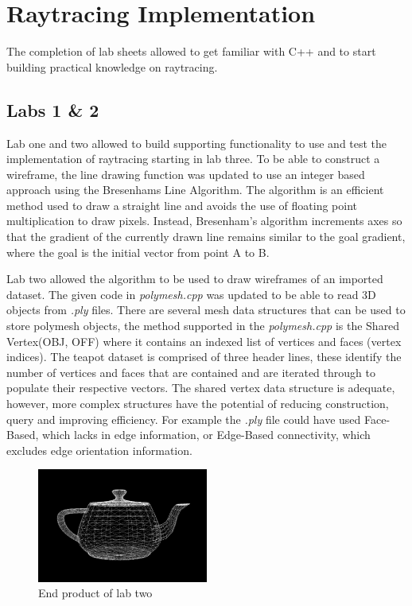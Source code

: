 \documentclass{article}
\begin{document}
\section{Raytracing Implementation}
The completion of lab sheets allowed to get familiar with C++ and to start building practical knowledge on raytracing. 

\subsection{Labs 1 \& 2}
Lab one and two allowed to build supporting functionality to use and test the implementation of raytracing starting in lab three. To be able to construct a wireframe, the line drawing function was updated to use an integer based approach using the Bresenhams Line Algorithm. The algorithm is an efficient method used to draw a straight line and avoids the use of floating point multiplication to draw pixels. Instead, Bresenham's algorithm increments axes so that the gradient of the currently drawn line remains similar to the goal gradient, where the goal is the initial vector from point A to B.

Lab two allowed the algorithm to be used to draw wireframes of an imported dataset. The given code in \textit{polymesh.cpp} was updated to be able to read 3D objects from \textit{.ply} files. There are several mesh data structures that can be used to store polymesh objects, the method supported in the \textit{polymesh.cpp} is the Shared Vertex(OBJ, OFF) where it contains an indexed list of vertices and faces (vertex indices). The teapot dataset is comprised of three header lines, these identify the number of vertices and faces that are contained and are iterated through to populate their respective vectors. The shared vertex data structure is adequate, however, more complex structures have the potential of reducing construction, query and improving efficiency. For example the \textit{.ply} file could have used Face-Based, which lacks in edge information, or Edge-Based connectivity, which excludes edge orientation information.

\begin{figure}[h]
\centering
\includegraphics[width=0.5\textwidth]{wireframe}
\captionsetup{justification=centering,margin=0.5cm}
\caption{End product of lab two}
\label{fig:wireframe}
\end{figure}
\end{document}

